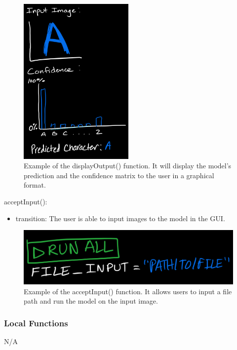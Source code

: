 \documentclass[12pt, titlepage]{article}
\begin{document}
\begin{figure}
\centering
\includegraphics[width=0.5\textwidth]{displayOutput.jpeg}
\caption{Example of the displayOutput() function. It will display the
  model's prediction and the confidence matrix to the user in a graphical
  format.}
\label{fig:displayOutput}
\end{figure}

\noindent acceptInput():
\begin{itemize}
\item transition: The user is able to input images to the model in the GUI.
\end{itemize}

\begin{figure}
  \centering
  \includegraphics[width=1\textwidth]{acceptInput.jpeg}
  \caption{Example of the acceptInput() function. It allows users to input a
  file path and run the model on the input image.}
  \label{fig:acceptInput}
  \end{figure}

\subsubsection{Local Functions}

N/A
\end{document}
